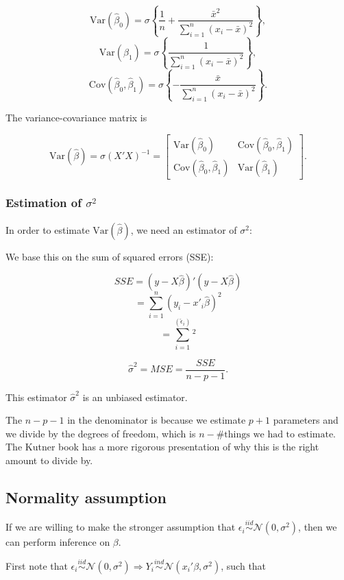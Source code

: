 \documentclass[
  letterpaper,
  DIV=11,
  numbers=noendperiod]{scrreport}
\begin{document}
\[\text{Var}(\hat \beta_0) = \sigma \left\{ \frac{1}{n} + \frac{\bar x^2}{\sum_{i=1}^n (x_i-\bar x)^2}\right\},\]
\[\text{Var}(\hat \beta_1) = \sigma \left\{\frac{1}{\sum_{i=1}^n (x_i-\bar x)^2}\right\},\]
\[\text{Cov}(\hat \beta_0, \hat \beta_1) = \sigma \left\{ - \frac{\bar x}{\sum_{i=1}^n (x_i-\bar x)^2}\right\}.\]

The variance-covariance matrix is

\[\text{Var}(\hat \beta) = \sigma(X'X)^{-1} = \left[ \begin{array}{cc} \text{Var}(\hat \beta_0) & \text{Cov}(\hat \beta_0, \hat \beta_1) \\ \text{Cov}(\hat \beta_0, \hat \beta_1) & \text{Var}(\hat \beta_1) \end{array} \right].\]

\hypertarget{estimation-of-sigma2}{%
\subsubsection{\texorpdfstring{Estimation of
\(\sigma^2\)}{Estimation of \textbackslash sigma\^{}2}}\label{estimation-of-sigma2}}

In order to estimate \(\text{Var}(\hat \beta)\), we need an estimator of
\(\sigma^2\):

We base this on the sum of squared errors (SSE):

\[SSE = (y - X\hat\beta)'(y-X\hat \beta)\]
\[ = \sum_{i=1}^n(y_i-x'_i\hat\beta)^2\]
\[ = \sum_{i=1}^(\hat \epsilon_i)^2\]

\[\hat \sigma^2 = MSE = \frac{SSE}{n - p - 1}.\]

This estimator \(\hat \sigma^2\) is an unbiased estimator.

The \(n-p-1\) in the denominator is because we estimate \(p+1\)
parameters and we divide by the degrees of freedom, which is
\(n - \text{\# things we had to estimate}\). The Kutner book has a more
rigorous presentation of why this is the right amount to divide by.

\hypertarget{normality-assumption}{%
\subsection{Normality assumption}\label{normality-assumption}}

If we are willing to make the stronger assumption that
\(\epsilon_i \stackrel{iid}{\sim} \mathcal N(0, \sigma^2)\), then we can
perform inference on \(\beta\).

First note that
\(\epsilon_i \stackrel{iid}{\sim} \mathcal N(0, \sigma^2) \Longrightarrow Y_i \stackrel{ind}{\sim} \mathcal N(x_i'\beta, \sigma^2)\),
such that
\end{document}

